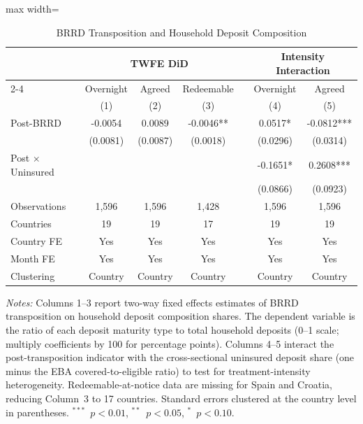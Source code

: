 \begin{table}[htbp]
\centering
\caption{BRRD Transposition and Household Deposit Composition}
\label{tab:main}
\begin{adjustbox}{max width=\textwidth}
\begin{tabular}{lcccccc}
\toprule
 & \multicolumn{3}{c}{TWFE DiD} & & \multicolumn{2}{c}{Intensity Interaction} \\
\cmidrule{2-4} \cmidrule{6-7}
 & Overnight & Agreed & Redeemable & & Overnight & Agreed \\
 & (1) & (2) & (3) & & (4) & (5) \\
\midrule
Post-BRRD & -0.0054 & 0.0089 & -0.0046** & & 0.0517* & -0.0812*** \\
 & (0.0081) & (0.0087) & (0.0018) & & (0.0296) & (0.0314) \\
Post $\times$ Uninsured & & & & & -0.1651* & 0.2608*** \\
 & & & & & (0.0866) & (0.0923) \\
\midrule
Observations & 1,596 & 1,596 & 1,428 & & 1,596 & 1,596 \\
Countries & 19 & 19 & 17 & & 19 & 19 \\
Country FE & Yes & Yes & Yes & & Yes & Yes \\
Month FE & Yes & Yes & Yes & & Yes & Yes \\
Clustering & Country & Country & Country & & Country & Country \\
\bottomrule
\end{tabular}
\end{adjustbox}
\begin{tablenotes}[flushleft]
\small
\item \textit{Notes:} Columns 1--3 report two-way fixed effects estimates of BRRD transposition on household deposit composition shares. The dependent variable is the ratio of each deposit maturity type to total household deposits (0--1 scale; multiply coefficients by 100 for percentage points). Columns 4--5 interact the post-transposition indicator with the cross-sectional uninsured deposit share (one minus the EBA covered-to-eligible ratio) to test for treatment-intensity heterogeneity. Redeemable-at-notice data are missing for Spain and Croatia, reducing Column~3 to 17 countries. Standard errors clustered at the country level in parentheses. $^{***}$~$p<0.01$, $^{**}$~$p<0.05$, $^{*}$~$p<0.10$.
\end{tablenotes}
\end{table}
